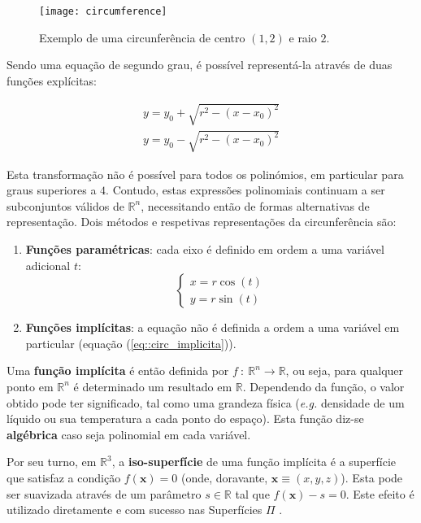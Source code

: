 \begin{figure}[!btp]
	\centering
	\texttt{[image: circumference]}
	\caption[Exemplo de uma circunferência]{Exemplo de uma circunferência de centro $(1, 2)$ e raio $2$.}
	\label{fig::circumference}
\end{figure}

Sendo uma equação de segundo grau, é possível representá-la através de duas funções explícitas:

\begin{eqnarray}
		y = y_0 + \sqrt{r^2 - (x - x_0)^2} \\
		y = y_0 - \sqrt{r^2 - (x - x_0)^2}
\end{eqnarray}

Esta transformação não é possível para todos os polinómios, em particular para graus superiores a $4$. Contudo, estas expressões polinomiais continuam a ser subconjuntos válidos de $\mathbb{R}^n$, necessitando então de formas alternativas de representação. Dois métodos e respetivas representações da circunferência são:

\begin{enumerate}
	\item \textbf{Funções paramétricas}: cada eixo é definido em ordem a uma variável adicional $t$:
	\begin{equation}
		\left\{\begin{array}{l}
			x = r\cos(t) \\
			y = r\sin(t)
		\end{array}\right.
	\label{eq::circ_parametrica}
	\end{equation}
	
	\item \textbf{Funções implícitas}: a equação não é definida a ordem a uma variável em particular (equação (\ref{eq::circ_implicita})).
\end{enumerate}

Uma \textbf{função implícita} é então definida por $f~:~\mathbb{R}^n \longrightarrow \mathbb{R}$, ou seja, para qualquer ponto em $\mathbb{R}^n$ é determinado um resultado em $\mathbb{R}$. Dependendo da função, o valor obtido pode ter significado, tal como uma grandeza física (\textit{e.g.} densidade de um líquido ou sua temperatura a cada ponto do espaço). Esta função diz-se \textbf{algébrica} caso seja polinomial em cada variável.

Por seu turno, em $\mathbb{R}^3$, a \textbf{iso-superfície} de uma função implícita é a superfície que satisfaz a condição $f(\mathbf{x}) = 0$ (onde, doravante, $\mathbf{x} \equiv (x,y,z)$). Esta pode ser suavizada através de um parâmetro $s \in \mathbb{R}$ tal que $f(\mathbf{x}) - s = 0$. Este efeito é utilizado diretamente e com sucesso nas Superfícies $\Pi$ \cite{Raposo2019}.

